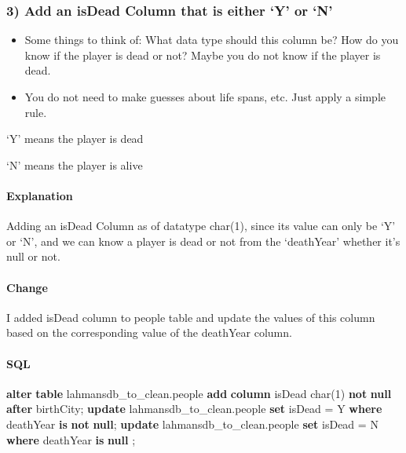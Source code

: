 \documentclass[11pt]{article}
\providecommand{\tightlist}{%
      \setlength{\itemsep}{0pt}\setlength{\parskip}{0pt}}
\newenvironment{Shaded}{}{}
\newcommand{\KeywordTok}[1]{\textcolor[rgb]{0.00,0.44,0.13}{\textbf{{#1}}}}
\newcommand{\DataTypeTok}[1]{\textcolor[rgb]{0.56,0.13,0.00}{{#1}}}
\newcommand{\DecValTok}[1]{\textcolor[rgb]{0.25,0.63,0.44}{{#1}}}
\newcommand{\StringTok}[1]{\textcolor[rgb]{0.25,0.44,0.63}{{#1}}}
\newcommand{\NormalTok}[1]{{#1}}
\newcommand{\OperatorTok}[1]{\textcolor[rgb]{0.40,0.40,0.40}{{#1}}}
\begin{document}
    \hypertarget{add-an-isdead-column-that-is-either-y-or-n}{%
\subsubsection{3) Add an isDead Column that is either `Y' or
`N'}\label{add-an-isdead-column-that-is-either-y-or-n}}

\begin{itemize}
\tightlist
\item
  Some things to think of: What data type should this column be? How do
  you know if the player is dead or not? Maybe you do not know if the
  player is dead.
\item
  You do not need to make guesses about life spans, etc. Just apply a
  simple rule.
\end{itemize}

`Y' means the player is dead

`N' means the player is alive

\hypertarget{explanation}{%
\paragraph{Explanation}\label{explanation}}

    Adding an isDead Column as of datatype char(1), since its value can only
be `Y' or `N', and we can know a player is dead or not from the
`deathYear' whether it's null or not.

    \hypertarget{change}{%
\paragraph{Change}\label{change}}

    I added isDead column to people table and update the values of this
column based on the corresponding value of the deathYear column.

    \hypertarget{sql}{%
\paragraph{SQL}\label{sql}}

    \begin{Shaded}
\begin{Highlighting}[]
\KeywordTok{alter} \KeywordTok{table}\NormalTok{ lahmansdb\_to\_clean.people}
\KeywordTok{add} \KeywordTok{column}\NormalTok{ isDead }\DataTypeTok{char}\NormalTok{(}\DecValTok{1}\NormalTok{) }\KeywordTok{not} \KeywordTok{null} \KeywordTok{after}\NormalTok{ birthCity;}
\KeywordTok{update}\NormalTok{ lahmansdb\_to\_clean.people}
\KeywordTok{set}\NormalTok{ isDead }\OperatorTok{=} \StringTok{\textquotesingle{}Y\textquotesingle{}} \KeywordTok{where}\NormalTok{ deathYear }\KeywordTok{is} \KeywordTok{not} \KeywordTok{null}\NormalTok{;}
\KeywordTok{update}\NormalTok{ lahmansdb\_to\_clean.people}
\KeywordTok{set}\NormalTok{ isDead }\OperatorTok{=} \StringTok{\textquotesingle{}N\textquotesingle{}} \KeywordTok{where}\NormalTok{ deathYear }\KeywordTok{is} \KeywordTok{null}\NormalTok{ ;}
\end{Highlighting}
\end{Shaded}
\end{document}
